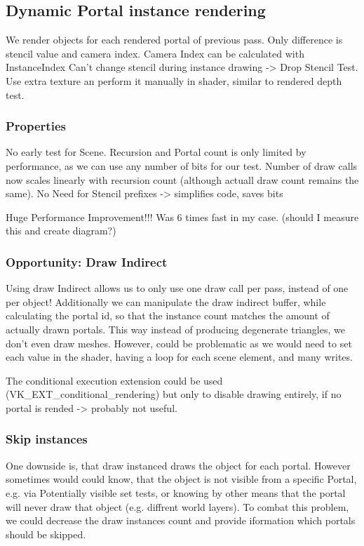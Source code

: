 \subsection{Dynamic Portal instance rendering}
We render objects for each rendered portal of previous pass. Only difference is stencil value and camera index.
Camera Index can be calculated with InstanceIndex
Can't change stencil during instance drawing -> Drop Stencil Test. Use extra texture an perform it manually in shader, similar to rendered depth test. 

\subsubsection{Properties}
No early test for Scene.
Recursion and Portal count is only limited by performance, as we can use any number of bits for our test.
Number of draw calls now scales linearly with recursion count (although actuall draw count remains the same).
No Need for Stencil prefixes -> simplifies code, saves bits

Huge Performance Improvement!!! Was 6 times fast in my case. 
(should I measure this and create diagram?)

\subsubsection{Opportunity: Draw Indirect}
Using draw Indirect allows us to only use one draw call per pass, instead of one per object!
Additionally we can manipulate the draw indirect buffer, while calculating the portal id, so that the instance count matches the amount of actually drawn portals.
This way instead of producing degenerate triangles, we don't even draw meshes.
However, could be problematic as we would need to set each value in the shader, having a loop for each scene element, and many writes.

The conditional execution extension could be used (VK\_EXT\_conditional\_rendering) but only to disable drawing entirely, if no portal is rended -> probably not useful.

\subsubsection{Skip instances}
One downside is, that draw instanced draws the object for each portal. However sometimes would could know, that the object is not visible from a specific Portal, e.g. via Potentially visible set tests, or knowing by other means that the portal will never draw that object (e.g. diffrent world layers).
To combat this problem, we could decrease the draw instances count and provide iformation which portals should be skipped.

